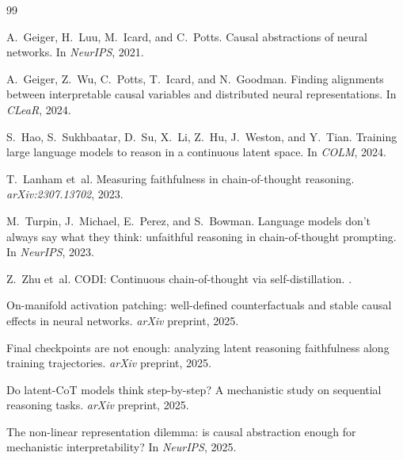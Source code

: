 \documentclass[letterpaper,10pt,twocolumn]{article}
\theoremstyle{definition}
\begin{document}
\begin{thebibliography}{99}

A.~Geiger, H.~Luu, M.~Icard, and C.~Potts.
\newblock Causal abstractions of neural networks.
\newblock In \emph{NeurIPS}, 2021.

A.~Geiger, Z.~Wu, C.~Potts, T.~Icard, and N.~Goodman.
\newblock Finding alignments between interpretable causal variables and distributed neural representations.
\newblock In \emph{CLeaR}, 2024.

S.~Hao, S.~Sukhbaatar, D.~Su, X.~Li, Z.~Hu, J.~Weston, and Y.~Tian.
\newblock Training large language models to reason in a continuous latent space.
\newblock In \emph{COLM}, 2024.

T.~Lanham et~al.
\newblock Measuring faithfulness in chain-of-thought reasoning.
\newblock \emph{arXiv:2307.13702}, 2023.

M.~Turpin, J.~Michael, E.~Perez, and S.~Bowman.
\newblock Language models don't always say what they think: unfaithful reasoning in chain-of-thought prompting.
\newblock In \emph{NeurIPS}, 2023.

Z.~Zhu et~al.
\newblock CODI: Continuous chain-of-thought via self-distillation.
.

On-manifold activation patching: well-defined counterfactuals and stable causal effects in neural networks.
\newblock \emph{arXiv} preprint, 2025.

Final checkpoints are not enough: analyzing latent reasoning faithfulness along training trajectories.
\newblock \emph{arXiv} preprint, 2025.

Do latent-CoT models think step-by-step? A mechanistic study on sequential reasoning tasks.
\newblock \emph{arXiv} preprint, 2025.

The non-linear representation dilemma: is causal abstraction enough for mechanistic interpretability?
\newblock In \emph{NeurIPS}, 2025.

\end{thebibliography}
\end{document}

